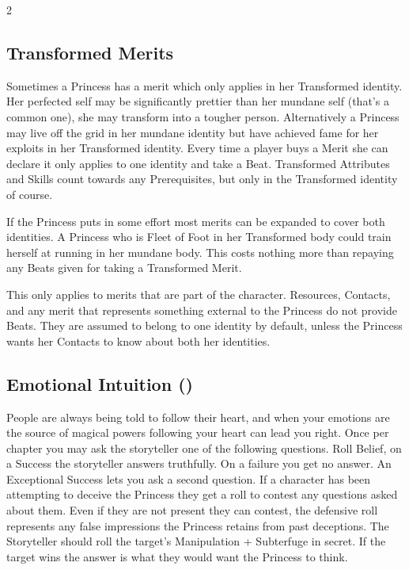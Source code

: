 \begin{multicols}{2}
\begin{mybox}     

\subsection*{Transformed Merits}

Sometimes a Princess has a merit which only applies in her Transformed identity. Her perfected self may be significantly prettier than her mundane self (that's a common one), she may transform into a tougher person. Alternatively a Princess may live off the grid in her mundane identity but have achieved fame for her exploits in her Transformed identity. Every time a player buys a Merit she can declare it only applies to one identity and take a Beat. Transformed Attributes and Skills count towards any Prerequisites, but only in the Transformed identity of course. 

If the Princess puts in some effort most merits can be expanded to cover both identities. A Princess who is Fleet of Foot in her Transformed body could train herself at running in her mundane body. This costs nothing more than repaying any Beats given for taking a Transformed Merit. 

This only applies to merits that are part of the character. Resources, Contacts, and any merit that represents something external to the Princess do not provide Beats. They are assumed to belong to one identity by default, unless the Princess wants her Contacts to know about both her identities.

\end{mybox}

\subsection*{Emotional Intuition (\textbullet\textbullet\textbullet)}

People are always being told to follow their heart, and when your emotions are the source of magical powers following your heart can lead you right. Once per chapter you may ask the storyteller one of the following questions. Roll Belief, on a Success the storyteller answers truthfully. On a failure you get no answer. An Exceptional Success lets you ask a second question. If a character has been attempting to deceive the Princess they get a roll to contest any questions asked about them. Even if they are not present they can contest, the defensive roll represents any false impressions the Princess retains from past deceptions. The Storyteller should roll the target's Manipulation + Subterfuge in secret. If the target wins the answer is what they would want the Princess to think.


\end{multicols}
